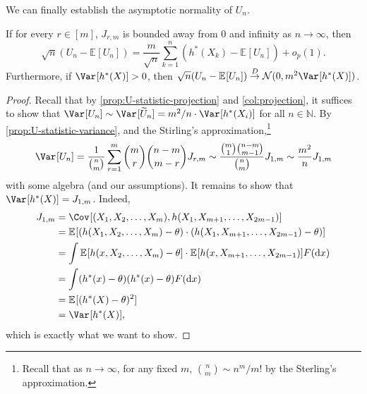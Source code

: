 We can finally establish the asymptotic normality of \(U_n\).

\begin{theorem}\label{thm:U-statistic}
	If for every \(r \in [m]\), \(J_{r, m}\) is bounded away from \(0\) and infinity as \(n \to \infty \), then
	\[
		\sqrt{n} (U_n - \mathbb{E}_{}[U_n] )
		= \frac{m}{\sqrt{n} } \sum_{k=1}^{n} (h^{\ast} (X_k) - \mathbb{E}_{}[U_n] ) + o_p(1).
	\]
	Furthermore, if \(\Var_{}[h^{\ast} (X)] > 0\), then \(\sqrt{n} (U_n - \mathbb{E}_{}[U_n] ) \overset{D}{\to} \mathcal{N} (0, m^2 \Var_{}[h^{\ast} (X)] )\).
\end{theorem}
\begin{proof}
	Recall that by \autoref{prop:U-statistic-projection} and \autoref{col:projection}, it suffices to show that \(\Var_{}[U_n] \sim \Var_{}[\widetilde{U} _n] = m^2 / n \cdot \Var_{}[h^{\ast} (X_i)]\) for all \(n \in \mathbb{N} \). By \autoref{prop:U-statistic-variance}, and the Stirling's approximation,\footnote{Recall that as \(n \to \infty \), for any fixed \(m\), \(\binom{n}{m} \sim n^m / m!\) by the Sterling's approximation.}
	\[
		\Var_{}[U_n]
		= \frac{1}{\binom{n}{m}} \sum_{r=1}^{m} \binom{m}{r} \binom{n-m}{m-r} J_{r, m}
		\sim \frac{\binom{m}{1} \binom{n-m}{m-1}}{\binom{n}{m}} J_{1, m}
		\sim \frac{m^2}{n} J_{1, m}
	\]
	with some algebra (and our assumptions). It remains to show that \(\Var_{}[h^{\ast} (X)] = J_{1, m}\). Indeed,
	\[
		\begin{split}
			J_{1, m}
			 & = \Cov_{}[(X_1, X_2, \dots , X_m), h(X_1, X_{m+1}, \dots , X_{2m-1})]                                                       \\
			 & = \mathbb{E}_{}[(h(X_1, X_2, \dots , X_m) - \theta ) \cdot (h(X_1, X_{m+1}, \dots , X_{2m-1}) - \theta ) ]                  \\
			 & = \int \mathbb{E}_{}[h(x, X_2, \dots , X_m) - \theta ] \cdot \mathbb{E}_{}[h(x, X_{m+1}, \dots , X_{2m-1})] F(\mathrm{d} x) \\
			 & = \int (h^{\ast} (x) - \theta ) (h^{\ast} (x) - \theta ) F(\mathrm{d} x)                                                    \\
			 & = \mathbb{E}_{}[(h^{\ast} (X) - \theta )^2]                                                                                 \\
			 & = \Var_{}[h^{\ast} (X)] ,
		\end{split}
	\]
	which is exactly what we want to show.
\end{proof}

